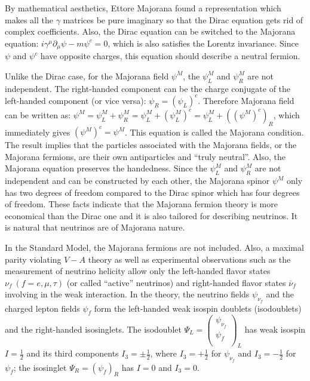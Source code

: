 By mathematical aesthetics, Ettore Majorana found a representation which makes all the $\gamma$ matrices be pure imaginary so that the Dirac equation gets rid of complex coefficients\cite{majorana2006symmetric}. Also, the Dirac equation can be switched to the Majorana equation: $i\gamma^\mu\partial_\mu\psi-m\psi^c=0$, which is also satisfies the Lorentz invariance\cite{zee2010quantum}. Since $\psi$ and $\psi^c$ have opposite charges, this equation should describe a neutral fermion\cite{zee2010quantum}. 

Unlike the Dirac case, for the Majorana field $\psi^M$, the $\psi^M_L$ and $\psi^M_R$ are not independent. The right-handed component can be the charge conjugate of the left-handed component (or vice versa): $\psi_R=(\psi_L)^c$\cite{akhmedov2014majorana}. Therefore Majorana field can be written as: $\psi^M=\psi_L^M+\psi_R^M=\psi^M_L+(\psi^M_L)^c=\psi^M_L+((\psi^M)^c)_R$, which immediately gives $(\psi^M)^c=\psi^M$. This equation is called the Majorana condition. The result implies that the particles associated with the Majorana fields, or the Majorana fermions, are their own antiparticles and ``truly neutral''\cite{akhmedov2014majorana}. Also, the Majorana equation preserves the handedness\cite{zee2010quantum}. Since the $\psi^M_L$ and $\psi^M_R$ are not independent and can be constructed by each other, the Majorana spinor $\psi^M$ only has two degrees of freedom compared to the Dirac spinor which has four degrees of freedom. These facts indicate that the Majorana fermion theory is more economical than the Dirac one and it is also tailored for describing neutrinos. It is natural that neutrinos are of Majorana nature.

In the Standard Model, the Majorana fermions are not included. Also, a maximal parity violating $V-A$ theory as well as experimental observations such as the measurement of neutrino helicity\cite{goldhaber1958helicity} allow only the left-handed flavor states $\nu_f~(f=e,\mu,\tau)$ (or called ``active'' neutrinos) and right-handed flavor states $\bar\nu_f$ involving in the weak interaction. In the theory, the neutrino fields $\psi_{\nu_f}$ and the charged lepton fields $\psi_f$ form the left-handed weak isospin doublets (isodoublets) and the right-handed isosinglets.
The isodoublet $\Psi_L = \begin{pmatrix}\psi_{\nu_f}\\ \psi_f\\ \end{pmatrix}_L$ has weak isospin $I=\frac{1}{2}$ and its third components $I_3=\pm \frac{1}{2}$, where $I_3=+\frac{1}{2}$ for $\psi_{\nu_f}$ and $I_3=-\frac{1}{2}$ for $\psi_f$; the isosinglet $\Psi_R = (\psi_f)_R$ has $I=0$ and $I_3=0$\cite{aitchison2012gauge, greiner2012theoretical}.

